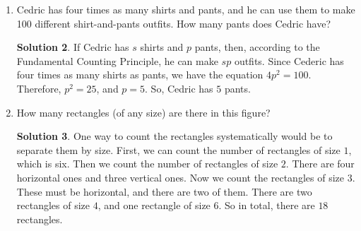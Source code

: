 \documentclass{article}
\theoremstyle{definition}
\newtheorem*{solution}{Solution}
\begin{document}
\begin{enumerate}
\begin{solution}
            We can solve this problem in a differnet way if we say that the 
            order doesn't matter. There are $7$ ways to choose the first person 
            and $6$ ways to choose the second person, but we are counting each 
            pair twice since they can be in one of two orders, so we divide by 
            two to get $\frac{7 \cdot 6}{2} = 21$ ways of choosing two people 
            out of seven where order doesn't matter. There are $3$ ways to 
            choose a boy and $4$ ways to choose a girl, so there are a total of 
            $12$ ways to choose a boy and a girl. And the probability is 
            $\frac{12}{21} = \frac{4}{7}$.
        \end{solution}
    \item Cedric has four times as many shirts and pants, and he can use them to make
        100 different shirt-and-pants outfits. How many pants does Cedric have?
        \begin{solution}
            If Cedric has $s$ shirts and $p$ pants, then, according to the 
            Fundamental Counting Principle, he can make $sp$ outfits. Since 
            Cederic has four times as many shirts as pants, we have the equation 
            $4p^2 = 100$. Therefore, $p^2 = 25$, and $p = 5$. So, Cedric has $5$ 
            pants.
        \end{solution}
    \item How many rectangles (of any size) are there in this figure?
        \begin{center}
        \end{center}
        \begin{solution}
            One way to count the rectangles systematically would be to separate 
            them by size. First, we can count the number of rectangles of size 
            $1$, which is six. Then we count the number of rectangles of size 
            $2$. There are four horizontal ones and three vertical ones. Now we 
            count the rectangles of size $3$. These must be horizontal, and 
            there are two of them. There are two rectangles of size $4$, and one 
            rectangle of size $6$. So in total, there are $18$ rectangles.


\end{solution}
\end{enumerate}
\end{document}
